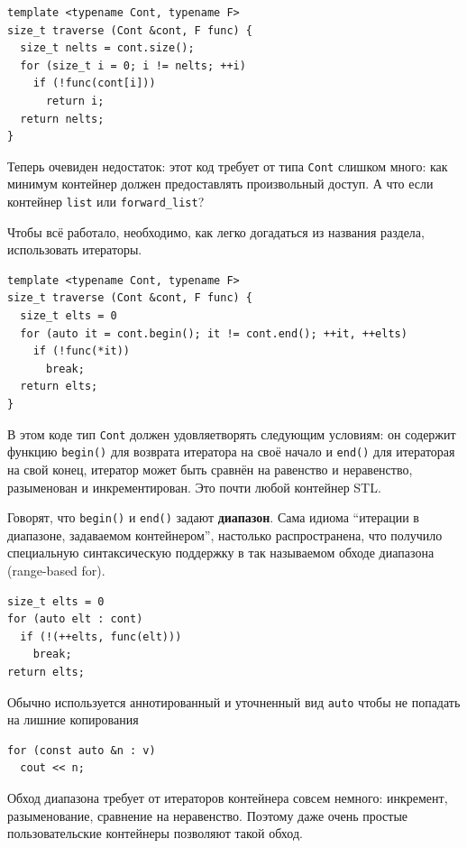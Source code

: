 \documentclass[a4paper,12pt,oneside]{article}
\begin{document}
\begin{lstlisting}
template <typename Cont, typename F>
size_t traverse (Cont &cont, F func) {
  size_t nelts = cont.size();
  for (size_t i = 0; i != nelts; ++i)
    if (!func(cont[i]))
      return i;
  return nelts;
}
\end{lstlisting}

Теперь очевиден недостаток: этот код требует от типа \lstinline!Cont! слишком много: как минимум контейнер должен предоставлять произвольный доступ. А что если контейнер \lstinline!list! или \lstinline!forward_list!?

Чтобы всё работало, необходимо, как легко догадаться из названия раздела, использовать итераторы.

\begin{lstlisting}
template <typename Cont, typename F>
size_t traverse (Cont &cont, F func) {
  size_t elts = 0
  for (auto it = cont.begin(); it != cont.end(); ++it, ++elts)
    if (!func(*it))
      break;
  return elts;
}
\end{lstlisting}

В этом коде тип \lstinline!Cont! должен удовляетворять следующим условиям: он содержит функцию \lstinline!begin()! для возврата итератора на своё начало и \lstinline!end()! для итераторая на свой конец, итератор может быть сравнён на равенство и неравенство, разыменован и инкрементирован. Это почти любой контейнер STL.

Говорят, что \lstinline!begin()! и \lstinline!end()! задают \textbf{диапазон}. Сама идиома ``итерации в диапазоне, задаваемом контейнером'', настолько распространена, что получило специальную синтаксическую поддержку в так называемом обходе диапазона (range-based for).

\begin{lstlisting}
size_t elts = 0
for (auto elt : cont)
  if (!(++elts, func(elt)))
    break;
return elts;
\end{lstlisting}

Обычно используется аннотированный и уточненный вид  \lstinline!auto! чтобы не попадать на лишние копирования

\begin{lstlisting}
for (const auto &n : v)
  cout << n;
\end{lstlisting}

Обход диапазона требует от итераторов контейнера совсем немного: инкремент, разыменование, сравнение на неравенство. Поэтому даже очень простые пользовательские контейнеры позволяют такой обход.
\end{document}

